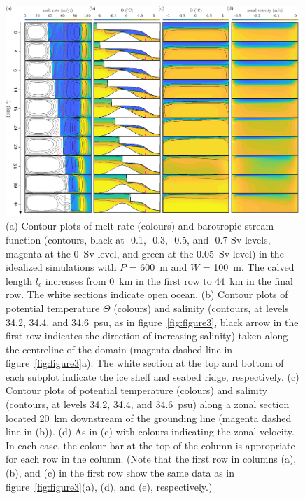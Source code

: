 \documentclass[draft]{agujournal2019}
\begin{document}
\begin{figure}
    \centering
    \includegraphics[width = 0.99\textwidth]{../make_figures/plots/figure5.pdf}
    \caption{(a) Contour plots of melt rate (colours) and barotropic stream function (contours, black at -0.1, -0.3, -0.5, and -0.7 Sv levels, magenta at the 0~Sv level, and green at the 0.05~Sv level) in the idealized simulations with $P$ = 600~m and $W$ = 100~m. The calved length $l_c$ increases from 0~km in the first row to 44~km in the final row. The white sections indicate open ocean. (b) Contour plots of potential temperature $\Theta$ (colours) and salinity (contours, at levels 34.2, 34.4, and 34.6~psu, as in figure~\ref{fig:figure3}, black arrow in the first row indicates the direction of increasing salinity) taken along the centreline of the domain (magenta dashed line in figure~\ref{fig:figure3}a). The white section at the top and bottom of each subplot indicate the ice shelf and seabed ridge, respectively. (c) Contour plots of potential temperature (colours) and salinity (contours, at levels 34.2, 34.4, and 34.6~psu) along a zonal section located 20~km downstream of the grounding line (magenta dashed line in (b)). (d) As in (c) with colours indicating the zonal velocity.  In each case, the colour bar at the top of the column is appropriate for each row in the column. (Note that the first row in columns (a), (b), and (c) in the first row show the same data as in figure~\ref{fig:figure3}(a), (d), and (e), respectively.) }
    \label{fig:figure5}
\end{figure}
\end{document}
